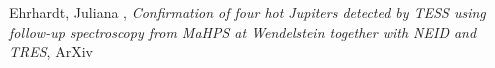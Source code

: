 \item[{\color{numcolor}\scriptsize1}] Ehrhardt, Juliana , \emph{Confirmation of four hot Jupiters detected by TESS using follow-up spectroscopy from MaHPS at Wendelstein together with NEID and TRES}, ArXiv